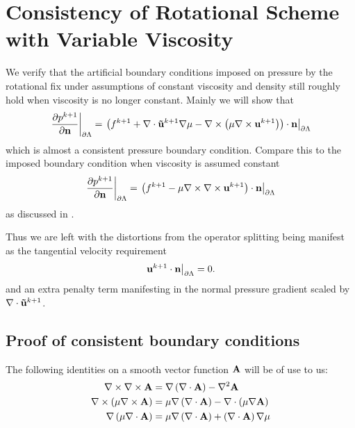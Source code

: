 \documentclass[letterpaper]{erdc}
\begin{document}
\section{Consistency of Rotational Scheme with Variable Viscosity }
We verify that the artificial boundary conditions imposed on pressure by the rotational fix under assumptions of constant viscosity and density still roughly hold when viscosity is no longer constant.  Mainly we will show that 
\begin{equation}
  \left.\frac{\partial p^{k+1}}{\partial \textbf{n}}\right|_{\partial\Lambda} = \left.\left(f^{k+1} + \nabla\cdot\mathbf{\tilde{u}}^{k+1}\nabla\mu - \nabla\times\left(\mu\nabla\times \textbf{u}^{k+1}  \right)  \right)\cdot \textbf{n}\right|_{\partial\Lambda}
\end{equation}
which is almost a consistent pressure boundary condition.  Compare this to the imposed boundary condition when viscosity is assumed constant
\begin{equation}
  \left.\frac{\partial p^{k+1}}{\partial \textbf{n}}\right|_{\partial\Lambda} = \left.\left(f^{k+1} - \mu\nabla\times\nabla\times \textbf{u}^{k+1} \right)\cdot \textbf{n}\right|_{\partial\Lambda}
\end{equation}
 as discussed in \cite{guermond2004error}.  
 
 Thus we are left with the distortions from the operator splitting being manifest as the tangential velocity requirement
\begin{equation}
  \left.\textbf{u}^{k+1}\cdot\textbf{n}\right|_{\partial\Lambda} = 0.
\end{equation}
and an extra penalty term manifesting in the normal pressure gradient scaled by $\nabla\cdot\mathbf{\tilde{u}}^{k+1}$.  



%
%
\subsection{Proof of consistent boundary conditions}
The following identities on a smooth vector function $\mathbf{A}$ will be of use to us:
\begin{align}
  \nabla\times\nabla\times \mathbf{A} &= \nabla\left( \nabla\cdot \mathbf{A}\right) - \nabla^2 \mathbf{A}\label{eqn:curlcurlidentity}\\
  \nabla\times\left( \mu \nabla\times \mathbf{A} \right) &= \mu\nabla\left(\nabla\cdot \mathbf{A}\right) - \nabla\cdot\left(\mu \nabla \mathbf{A} \right)\label{eqn:curlmucurlidentity}\\
  \nabla\left( \mu \nabla\cdot \mathbf{A}\right) &= \mu\nabla\left(\nabla\cdot \mathbf{A}\right) + \left( \nabla\cdot \mathbf{A}\right)\nabla\mu\label{eqn:gradmudividentity}
\end{align}
\end{document}
